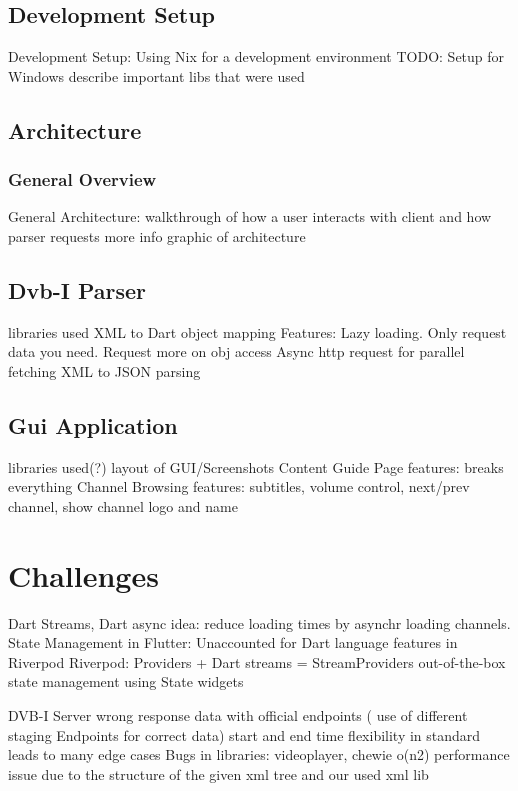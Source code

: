\documentclass[conference]{IEEEtran}
\begin{document}
\subsection{Development Setup}\label{dev_set}

Development Setup:
Using Nix for a development environment
TODO: Setup for Windows
describe important libs that were used


\subsection{Architecture}\label{arch}

\subsubsection{General Overview}
General Architecture:
walkthrough of how a user interacts with client and how parser requests more info
graphic of architecture


\subsection{Dvb-I Parser}\label{dvbi_parser}

libraries used
XML to Dart object mapping
Features:
Lazy loading. Only request data you need. Request more on obj access
Async http request for parallel fetching
XML to JSON parsing  

\subsection{Gui Application}\label{gui}

libraries used(?)
layout of GUI/Screenshots
Content Guide Page
features: breaks everything 
Channel Browsing
features: subtitles, volume control, next/prev channel, show channel logo and name

\section{Challenges}

Dart Streams, Dart async
idea: reduce loading times by asynchr loading channels. 
State Management in Flutter: 
Unaccounted for Dart language features in Riverpod
Riverpod: Providers + Dart streams = StreamProviders
out-of-the-box state management using State widgets
	
DVB-I Server wrong response data with official endpoints ( use of different staging Endpoints for correct data)
start and end time 
flexibility in standard leads to many edge cases 
Bugs in libraries: videoplayer, chewie
o(n2) performance issue due to the structure of the given xml tree and our used xml lib
\end{document}

